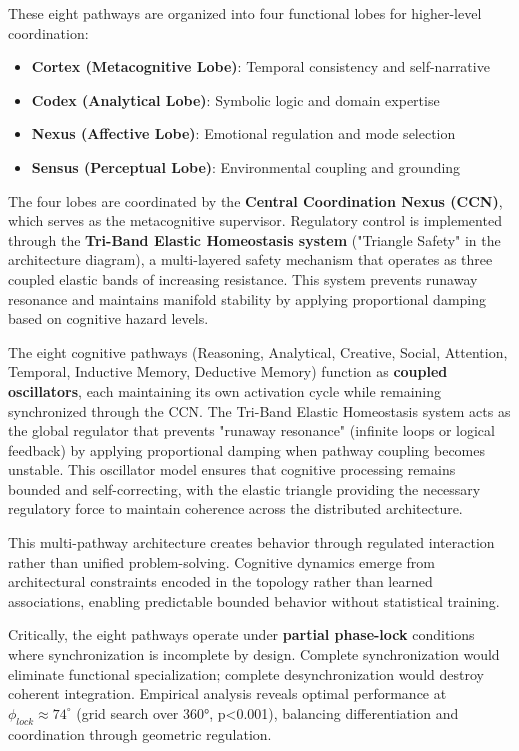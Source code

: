 \documentclass[12pt,a4paper]{report}
\begin{document}
These eight pathways are organized into four functional lobes for higher-level coordination:

\begin{itemize}
    \item \textbf{Cortex (Metacognitive Lobe)}: Temporal consistency and self-narrative
    \item \textbf{Codex (Analytical Lobe)}: Symbolic logic and domain expertise
    \item \textbf{Nexus (Affective Lobe)}: Emotional regulation and mode selection
    \item \textbf{Sensus (Perceptual Lobe)}: Environmental coupling and grounding
\end{itemize}


The four lobes are coordinated by the \textbf{Central Coordination Nexus (CCN)}, which serves as the metacognitive supervisor. Regulatory control is implemented through the \textbf{Tri-Band Elastic Homeostasis system} ("Triangle Safety" in the architecture diagram), a multi-layered safety mechanism that operates as three coupled elastic bands of increasing resistance. This system prevents runaway resonance and maintains manifold stability by applying proportional damping based on cognitive hazard levels.

The eight cognitive pathways (Reasoning, Analytical, Creative, Social, Attention, Temporal, Inductive Memory, Deductive Memory) function as \textbf{coupled oscillators}, each maintaining its own activation cycle while remaining synchronized through the CCN. The Tri-Band Elastic Homeostasis system acts as the global regulator that prevents "runaway resonance" (infinite loops or logical feedback) by applying proportional damping when pathway coupling becomes unstable. This oscillator model ensures that cognitive processing remains bounded and self-correcting, with the elastic triangle providing the necessary regulatory force to maintain coherence across the distributed architecture.

This multi-pathway architecture creates behavior through regulated interaction rather than unified problem-solving. Cognitive dynamics emerge from architectural constraints encoded in the topology rather than learned associations, enabling predictable bounded behavior without statistical training.

Critically, the eight pathways operate under \textbf{partial phase-lock} conditions where synchronization is incomplete by design. Complete synchronization would eliminate functional specialization; complete desynchronization would destroy coherent integration. Empirical analysis reveals optimal performance at $\phi_{lock}\approx 74^\circ$ (grid search over 360°, p<0.001), balancing differentiation and coordination through geometric regulation.
\end{document}
